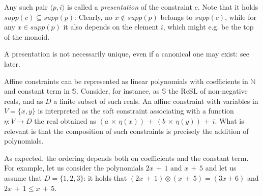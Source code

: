 \documentclass{llncs}
\def\monop{\otimes}
\begin{document}
Any such pair $\langle p, i \rangle$ is called a \emph{presentation} of the constraint $c$.
Note that it holds $supp(c) \subseteq supp(p)$:
Clearly, no $x \not \in supp(p)$ belongs to $supp(c)$,
%
while for any $x \in supp(p)$ it also depends on the element 
$i$, which might e.g. be the top of the monoid.

A presentation is not necessarily unique,
even if a canonical one may exist: see later.

\begin{example}\label{execlim}
	Affine constraints can be represented as linear polynomials with coefficients in $\mathbb{N}$	
	and constant term in $\mathbb{S}$.
	Consider, for instance, as $\mathbb S$ the ReSL of non-negative reals, 
	and as $D$ a finite subset of such reals.
	An affine constraint with variables in $V = \{x,y\}$ 
	is interpreted as the soft constraint associating 
	with a function $\eta: V \rightarrow D$ the real 
	obtained as $(a \, \times \, \eta(x)) \, + \, (b \, \times \, \eta(y)) \, + \, i$.
	What is relevant is that the composition of such constraints is precisely 
	the addition of polynomials. 
	
	As expected, the ordering depends both on coefficients and the constant term.
	For example, let us consider the polynomials $2x \, + \, 1$ and $x \, + \, 5$
	and let us assume that $D = \{1, 2, 3\}$: it holds that
	$(2x \, + \, 1)\monop (x \, + \, 5) = (3x + 6)$ and  
	$2x \, + \, 1 \leq x \, + \, 5$.
\end{example}
\end{document}
